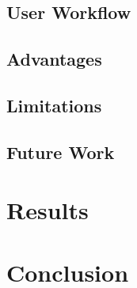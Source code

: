 \subsection{User Workflow}


\subsection{Advantages}


\subsection{Limitations}


\subsection{Future Work}


\section{Results}


\section{Conclusion}








